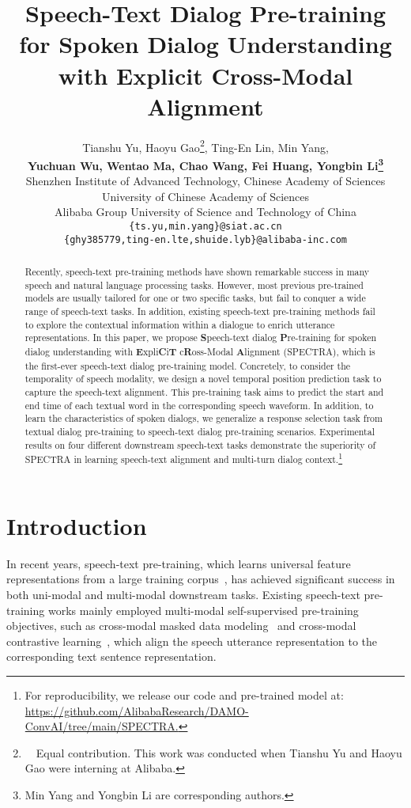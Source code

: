 \documentclass[11pt]{article}
\title{Speech-Text Dialog Pre-training for Spoken Dialog Understanding \\ with Explicit Cross-Modal Alignment}
\author{
Tianshu Yu, Haoyu Gao\thanks{\ \ Equal contribution. This work was conducted when Tianshu Yu and Haoyu Gao were interning at Alibaba.}, Ting-En Lin, Min Yang, \\  
\textbf{Yuchuan Wu, Wentao Ma, Chao Wang, Fei Huang, Yongbin Li\thanks{\textsuperscript{\textdagger} Min Yang and Yongbin Li are corresponding authors.}}  \\
  Shenzhen Institute of Advanced Technology, Chinese Academy of Sciences \\ 
  University of Chinese Academy of Sciences\\
  Alibaba Group \quad
  University of Science and Technology of China \\
  \texttt{\{ts.yu,min.yang\}@siat.ac.cn} \\ 
  \texttt{\{ghy385779,ting-en.lte,shuide.lyb\}@alibaba-inc.com}
}
\begin{document}
\maketitle
\begin{abstract}
Recently, speech-text pre-training methods have shown remarkable success in many speech and natural language processing tasks. However, most previous pre-trained models are usually tailored for one or two specific tasks, but fail to conquer a wide range of speech-text tasks. In addition, existing speech-text pre-training methods fail to explore the contextual information within a dialogue to enrich utterance representations. In this paper, we propose \textbf{S}peech-text dialog \textbf{P}re-training for spoken dialog understanding with \textbf{E}xpli\textbf{C}i\textbf{T} c\textbf{R}oss-Modal \textbf{A}lignment (SPECTRA), which is the first-ever speech-text dialog pre-training model. Concretely, to consider the temporality of speech modality, we design a novel temporal position prediction task to capture the speech-text alignment. This pre-training task aims to predict the start and end time of each textual word in the corresponding speech waveform. In addition, to learn the characteristics of spoken dialogs,  we generalize a response selection task from textual dialog pre-training to speech-text dialog pre-training scenarios. Experimental results on four different downstream speech-text tasks demonstrate the superiority of SPECTRA in learning speech-text alignment and multi-turn dialog context.\footnote{For reproducibility, we release our code and pre-trained model at: \url{https://github.com/AlibabaResearch/DAMO-ConvAI/tree/main/SPECTRA.}}

\end{abstract}

\section{Introduction}







In recent years, speech-text pre-training, which learns universal feature representations from a large training corpus~\citep{chen2018almost,ctal,bapna2021slam}, has achieved significant success in both uni-modal \citep{wav2vec,dosovitskiy2020image} and multi-modal \citep{lu2019vilbert,radford2021learning}  downstream tasks. Existing speech-text pre-training works mainly employed multi-modal self-supervised pre-training objectives, such as cross-modal masked data modeling~\citep{ctal,kang2022self} and cross-modal contrastive learning~\citep{calm,elizalde2022clap}, which align the speech utterance representation to the corresponding text sentence representation. 
\end{document}
